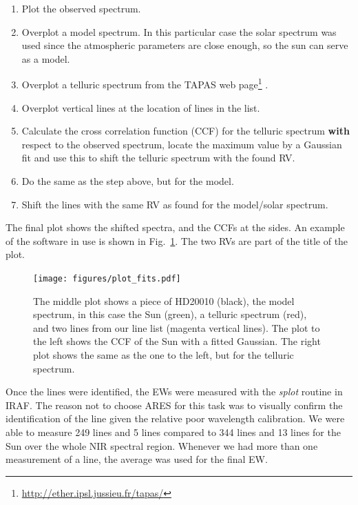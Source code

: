 \documentclass{aa}
\begin{document}
\begin{enumerate}
    \item Plot the observed spectrum.
    \item Overplot a model spectrum. In this particular case the solar spectrum was
        used since the atmospheric parameters are close enough, so the sun can
        serve as a model.
    \item Overplot a telluric spectrum from the TAPAS web
          page\footnote{\url{http://ether.ipsl.jussieu.fr/tapas/}} \citep{Bertaux2014}.
    \item Overplot vertical lines at the location of lines in the list.
    \item Calculate the cross correlation function (CCF) for the telluric spectrum
        \textbf{with} respect to the observed spectrum, locate the maximum value by a Gaussian fit
        and use this to shift the telluric spectrum with the found RV.
    \item Do the same as the step above, but for the model.
    \item Shift the lines with the same RV as found for the model/solar spectrum.
\end{enumerate}
The final plot shows the shifted spectra, and the CCFs at the sides. An
example of the software in use is shown in Fig.~\ref{fig:plot_fits}. The
two RVs are part of the title of the plot.

\begin{figure}[tbp!]
    \centering
    \texttt{[image: figures/plot\_fits.pdf]}
    \caption{The middle plot shows a piece of HD20010 (black), the model
    spectrum, in this case the Sun (green), a telluric spectrum (red),
    and two lines from our line list (magenta vertical lines). The
    plot to the left shows the CCF of the Sun with a fitted Gaussian.
    The right plot shows the same as the one to the left, but for the
    telluric spectrum.}
    \label{fig:plot_fits}
\end{figure}

Once the lines were identified, the EWs were measured with the
\emph{splot} routine in IRAF. The reason not to choose ARES for this
task was to visually confirm the identification of the line given the
relative poor wavelength calibration. We were able to measure 249
 lines and 5  lines compared to 344 
lines and 13  lines for the Sun over the whole NIR spectral
region. Whenever we had more than one measurement of a line, the average
was used for the final EW.
\end{document}
